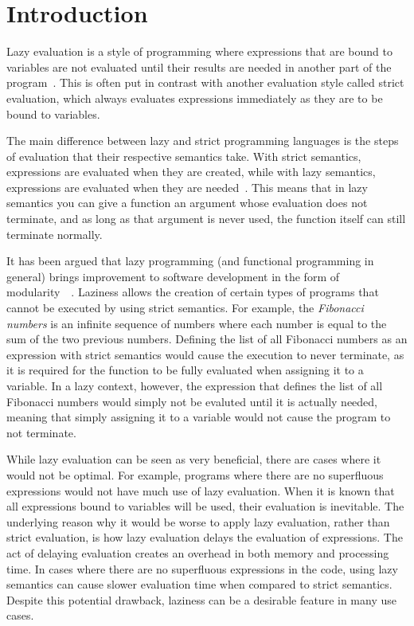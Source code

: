\chapter{Introduction}
\label{chapter:intro}
Lazy evaluation is a style of programming where expressions that are bound to variables
are not evaluated until their results are needed in another part of the
program~\cite{Lazyeval6:online}. This is often put in contrast with another
evaluation style called strict evaluation, which always evaluates expressions
immediately as they are to be bound to variables. 

The main difference between lazy and strict programming languages is the steps
of evaluation that their respective semantics take. With strict semantics,
expressions are evaluated when they are created, while with lazy semantics,
expressions are evaluated when they are needed~\cite{ThunkHas27:online}.
This means that in lazy semantics you can give a function an argument
whose evaluation does not terminate, and as long as
that argument is never used, the function itself can still terminate normally.

It has been argued that lazy programming (and functional programming in general)
brings improvement to software development in the form of
modularity~\cite{Hu1989}~\cite{Hu2015}. Laziness allows the creation of certain
types of programs that cannot be executed by using strict semantics.
For example, the \textit{Fibonacci numbers} is an infinite sequence of numbers
where each number is equal to the sum of the two previous numbers.
Defining the list of all Fibonacci numbers as an expression with strict semantics would
cause the execution to never terminate, as it is required for the function to be
fully evaluated when assigning it to a variable. In a lazy context, however,
the expression that defines the list of all Fibonacci numbers would simply not
be evaluted until it is actually needed, meaning that simply assigning it to a
variable would not cause the program to not terminate.

While lazy evaluation can be seen as very beneficial, there are cases where it
would not be optimal. For example, programs where there are
no superfluous expressions would not have much use of lazy evaluation. When it
is known that all expressions bound to variables will be used,
their evaluation is inevitable. The underlying reason why it would be worse
to apply lazy evaluation, rather than strict evaluation, is how lazy evaluation
delays the evaluation of expressions. The act of delaying evaluation creates
an overhead in both memory and processing time.
In cases where there are no superfluous expressions in the code, using lazy
semantics can cause slower evaluation time when compared to
strict semantics. Despite this potential drawback, laziness can be a desirable
feature in many use cases. 

